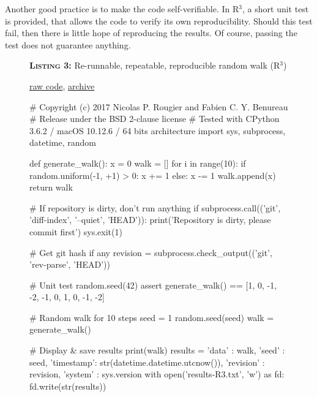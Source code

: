 \documentclass[a4paper,11pt]{article}
\begin{document}
Another good practice is to make the code self-verifiable. In R$^3$, a short unit test is provided, that allows the code to verify its own reproducibility. Should this test fail, then there is little hope of reproducing the results. Of course, passing the test does not guarantee anything.\\

\begin{figure}[t!]
\noindent \begin{minipage}[c]{\linewidth}
\begin{code}{\parbox{.8\textwidth}{\textbf{\textsc{Listing 3:}} Re-runnable, repeatable, reproducible random walk (R$^3$)}\parbox{.161\textwidth}{\hfill \href{https://raw.githubusercontent.com/rougier/random-walk/frontiers/random-walk-R3.py}{raw code}, \href{https://doi.org/10.5281/zenodo.848217}{archive}}}
# Copyright (c) 2017 Nicolas P. Rougier and Fabien C. Y. Benureau
# Release under the BSD 2-clause license
# Tested with CPython 3.6.2 / macOS 10.12.6 / 64 bits architecture
import sys, subprocess, datetime, random

def generate_walk():
    x = 0
    walk = []
    for i in range(10):
        if random.uniform(-1, +1) > 0:
            x += 1
        else:
            x -= 1
        walk.append(x)
    return walk

# If repository is dirty, don't run anything
if subprocess.call(('git', 'diff-index', '--quiet', 'HEAD')):
    print('Repository is dirty, please commit first')
    sys.exit(1)

# Get git hash if any
revision = subprocess.check_output(('git', 'rev-parse', 'HEAD'))

# Unit test
random.seed(42)
assert generate_walk() == [1, 0, -1, -2, -1, 0, 1, 0, -1, -2]

# Random walk for 10 steps
seed = 1
random.seed(seed)
walk = generate_walk()

# Display & save results
print(walk)
results = {'data'       : walk,
            'seed'      : seed,
            'timestamp': str(datetime.datetime.utcnow()),
            'revision' : revision,
            'system'    : sys.version}
with open('results-R3.txt', 'w') as fd:
    fd.write(str(results))
\end{code}
\end{minipage}\\
\end{figure}
\end{document}
